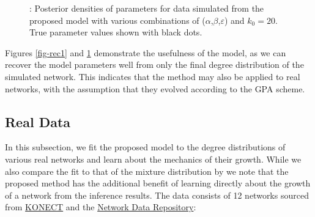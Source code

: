 \documentclass[
  sn-basic,
]{sn-jnl}
\theoremstyle{plain}
\theoremstyle{plain}
\theoremstyle{remark}
\begin{document}
\begin{figure}


\caption{\label{fig-rec2}: Posterior densities of parameters for data
simulated from the proposed model with various combinations of
(\(\alpha\),\(\beta\),\(\varepsilon\)) and \(k_0=20\). True parameter
values shown with black dots.}

\end{figure}%

Figures \ref{fig-rec1} and \ref{fig-rec2} demonstrate the usefulness of
the model, as we can recover the model parameters well from only the
final degree distribution of the simulated network. This indicates that
the method may also be applied to real networks, with the assumption
that they evolved according to the GPA scheme.

\subsection{Real Data}\label{sec-real}

In this subsection, we fit the proposed model to the degree
distributions of various real networks and learn about the mechanics of
their growth. While we also compare the fit to that of the mixture
distribution by \citet{Lee24} we note that the proposed method has the
additional benefit of learning directly about the growth of a network
from the inference results. The data consists of 12 networks sourced
from \href{konect.cc}{KONECT} and the
\href{https://networkrepository.com}{Network Data Repository}\citep{nr}:
\end{document}
